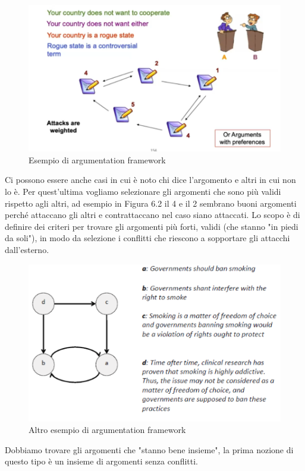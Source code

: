 \begin{figure}[H]
    \centering
    \includegraphics[width=12cm, keepaspectratio]{img/Cap6/arg2.png}
    \caption{Esempio di argumentation framework}
\end{figure}
Ci possono essere anche casi in cui è noto chi dice l'argomento e altri in cui
non lo è. Per quest'ultima vogliamo selezionare gli argomenti che sono più
validi rispetto agli altri, ad esempio in Figura 6.2 il 4 e il 2 sembrano buoni
argomenti perché attaccano gli altri e contrattaccano nel caso siano attaccati.
Lo scopo è di definire dei criteri per trovare gli argomenti più forti, validi
(che stanno "in piedi da soli"), in modo da selezione i conflitti che riescono a
sopportare gli attacchi dall'esterno.

\begin{figure}[H]
    \centering
    \includegraphics[width=12cm, keepaspectratio]{img/Cap6/arg3.png}
    \caption{Altro esempio di argumentation framework}
\end{figure}

Dobbiamo trovare gli argomenti che "stanno bene insieme", la prima nozione di
questo tipo è un insieme di argomenti senza conflitti.

